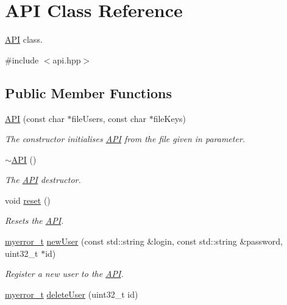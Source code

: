 \hypertarget{classAPI}{}\section{A\+P\+I Class Reference}
\label{classAPI}


\hyperlink{classAPI}{A\+P\+I} class.  




{\ttfamily \#include $<$api.\+hpp$>$}

\subsection*{Public Member Functions}
\begin{DoxyCompactItemize}
\item 
\hyperlink{classAPI_ab2698dd4fb5e3fefa988f8020937b955}{A\+P\+I} (const char $\ast$file\+Users, const char $\ast$file\+Keys)
\begin{DoxyCompactList}\small\item\em The constructor initialises \hyperlink{classAPI}{A\+P\+I} from the file given in parameter. \end{DoxyCompactList}\item 
\hyperlink{classAPI_a583ec65b542b44e4b7013f5fc830fdcd}{$\sim$\+A\+P\+I} ()
\begin{DoxyCompactList}\small\item\em The \hyperlink{classAPI}{A\+P\+I} destructor. \end{DoxyCompactList}\item 
void \hyperlink{classAPI_a1a705f7e87f72e3cd8c078f438fac948}{reset} ()
\begin{DoxyCompactList}\small\item\em Resets the \hyperlink{classAPI}{A\+P\+I}. \end{DoxyCompactList}\item 
\hyperlink{error_8hpp_acabd2917084445509becf54ab64a4bd0}{myerror\+\_\+t} \hyperlink{classAPI_a9b02f83fb6209418f8b310845082ca80}{new\+User} (const std\+::string \&login, const std\+::string \&password, uint32\+\_\+t $\ast$id)
\begin{DoxyCompactList}\small\item\em Register a new user to the \hyperlink{classAPI}{A\+P\+I}. \end{DoxyCompactList}\item 
\hyperlink{error_8hpp_acabd2917084445509becf54ab64a4bd0}{myerror\+\_\+t} \hyperlink{classAPI_ad94326209dc6c62d65cde5a37e3c0078}{delete\+User} (uint32\+\_\+t id)

\end{DoxyCompactItemize}

